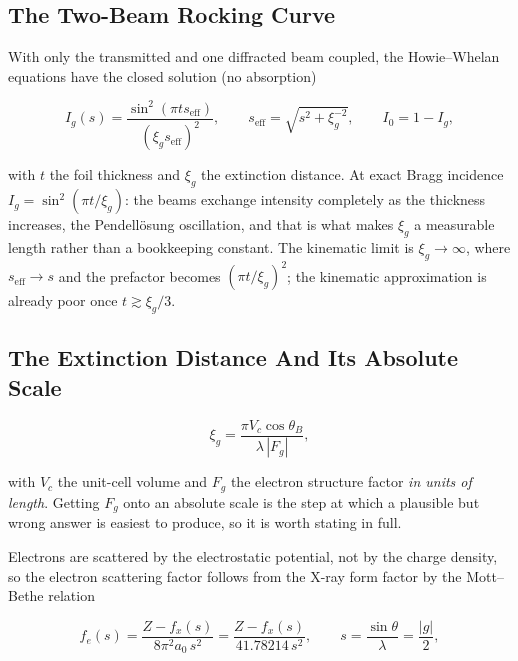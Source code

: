 \subsection{The Two-Beam Rocking Curve}

With only the transmitted and one diffracted beam coupled, the Howie--Whelan equations have
the closed solution (no absorption)

\begin{equation}
  I_{g}(s) = \frac{\sin^{2}\!\left(\pi t s_{\mathrm{eff}}\right)}
                  {\left(\xi_{g}s_{\mathrm{eff}}\right)^{2}},
  \qquad
  s_{\mathrm{eff}} = \sqrt{s^{2} + \xi_{g}^{-2}},
  \qquad
  I_{0} = 1 - I_{g},
  \label{eq:two-beam}
\end{equation}

with \(t\) the foil thickness and \(\xi_{g}\) the extinction distance. At exact Bragg
incidence \(I_{g} = \sin^{2}(\pi t/\xi_{g})\): the beams exchange intensity completely as
the thickness increases, the Pendell\"osung oscillation, and that is what makes
\(\xi_{g}\) a measurable length rather than a bookkeeping constant. The kinematic limit is
\(\xi_{g}\to\infty\), where \(s_{\mathrm{eff}}\to s\) and the prefactor becomes
\((\pi t/\xi_{g})^{2}\); the kinematic approximation is already poor once
\(t \gtrsim \xi_{g}/3\).

\subsection{The Extinction Distance And Its Absolute Scale}

\begin{equation}
  \xi_{g} = \frac{\pi V_{c}\cos\theta_{B}}{\lambda\,|F_{g}|},
  \label{eq:xi}
\end{equation}

with \(V_{c}\) the unit-cell volume and \(F_{g}\) the electron structure factor \emph{in
units of length}. Getting \(F_g\) onto an absolute scale is the step at which a plausible
but wrong answer is easiest to produce, so it is worth stating in full.

Electrons are scattered by the electrostatic potential, not by the charge density, so the
electron scattering factor follows from the X-ray form factor by the Mott--Bethe relation

\begin{equation}
  f_{e}(s) = \frac{Z - f_{x}(s)}{8\pi^{2}a_{0}\,s^{2}}
           = \frac{Z - f_{x}(s)}{41.78214\,s^{2}},
  \qquad s = \frac{\sin\theta}{\lambda} = \frac{|g|}{2},
  \label{eq:mott-bethe}
\end{equation}


